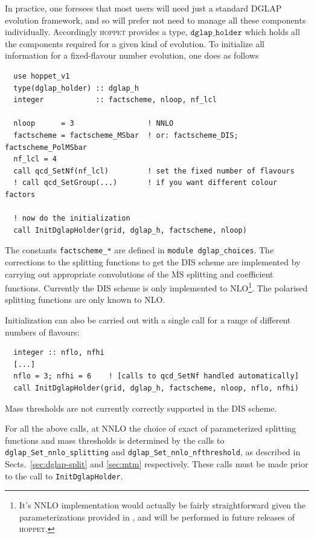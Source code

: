 \documentclass[12pt]{article}
\newcommand{\MSbar}{\overline{\mathrm{MS}}}
\newcommand{\hoppet}{\textsc{hoppet}\xspace}
\newcommand{\ttt}[1]{\texttt{#1}}
\begin{document}
In practice, one foresees that most users will need just a standard
DGLAP evolution framework, and so will prefer not need to manage
all these components individually. Accordingly \hoppet provides a
type, $\ttt{dglap\_holder}$ which holds all the components 
required for
a given kind of evolution. To initialize all information for a
fixed-flavour number evolution, one does as follows
%
\begin{lstlisting}
  use hoppet_v1
  type(dglap_holder) :: dglap_h
  integer            :: factscheme, nloop, nf_lcl  

  nloop      = 3                 ! NNLO
  factscheme = factscheme_MSbar  ! or: factscheme_DIS; factscheme_PolMSbar
  nf_lcl = 4
  call qcd_SetNf(nf_lcl)         ! set the fixed number of flavours
  ! call qcd_SetGroup(...)       ! if you want different colour factors

  ! now do the initialization
  call InitDglapHolder(grid, dglap_h, factscheme, nloop)
\end{lstlisting}
The constants \ttt{factscheme\_*} are defined in \ttt{module
  dglap\_choices}. %
The corrections to the splitting functions to get the DIS scheme are
implemented by carrying out appropriate convolutions of the $\MSbar$
splitting and coefficient functions. Currently the DIS scheme is only
implemented to NLO\footnote{It's NNLO implementation would actually be fairly
straightforward given the parameterizations provided in
\cite{White:2005wm}, and will be performed in
future releases of \hoppet.}.
 The polarised splitting functions are only known to NLO.

Initialization can also be carried out with a single call for a range of
different numbers of flavours:
\begin{lstlisting}
  integer :: nflo, nfhi
  [...]
  nflo = 3; nfhi = 6    ! [calls to qcd_SetNf handled automatically]
  call InitDglapHolder(grid, dglap_h, factscheme, nloop, nflo, nfhi)
\end{lstlisting}
Mass thresholds are not currently correctly supported in the DIS
scheme.

For all the above calls, at NNLO the choice of exact of parameterized
splitting functions and mass thresholds is determined by the calls to
\ttt{dglap\_Set\_nnlo\_splitting} and
\ttt{dglap\_Set\_nnlo\_nfthreshold}, as described in
Sects.~\ref{sec:dglap-split} and \ref{sec:mtm} respectively. These
calls must be made prior to the call to \ttt{InitDglapHolder}.
\end{document}

